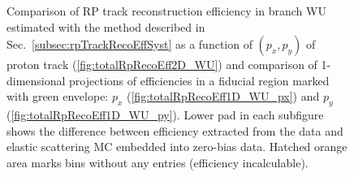 \begin{figure}[h]%
	\centering
	\parbox{0.54\textwidth}{
		\centering
		\begin{subfigure}[b]{\linewidth}{\vspace{10pt}
				}
		\end{subfigure}
		\begin{minipage}[t][0.64\linewidth][t]{\linewidth}\vspace{10pt}
		\caption[Coparison of estimated RP track reconstruction efficiency in 2D and 1D (branch WU).]%
		{Comparison of RP track reconstruction efficiency in branch WU estimated with the method described in Sec.~\ref{subsec:rpTrackRecoEffSyst} as a function of $(p_{x},p_{y})$ of proton track (\ref{fig:totalRpRecoEff2D_WU}) and comparison of 1-dimensional projections of efficiencies in a fiducial region marked with green envelope: $p_{x}$ (\ref{fig:totalRpRecoEff1D_WU_px}) and $p_{y}$ (\ref{fig:totalRpRecoEff1D_WU_py}). Lower pad in each subfigure shows the difference between efficiency extracted from the data and elastic scattering MC embedded into zero-bias data. Hatched orange area marks bins without any entries (efficiency incalculable).}\label{fig:totalRpRecoEff_WU}
		\end{minipage}
	}
	\quad
	\parbox{0.43\textwidth}{
		\centering
}
\end{figure}
